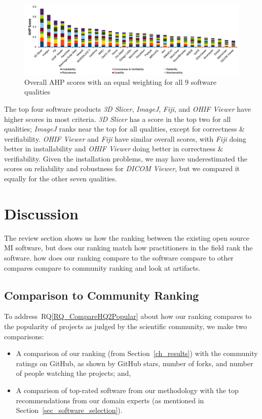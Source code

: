 \documentclass[11pt]{article}
\newcommand{\rqref}[1]{RQ\ref{#1}}
\begin{document}
\begin{figure}[!ht]
\includegraphics[scale=0.47]{overall_scores.pdf}
\caption{Overall AHP scores with an equal weighting for all 9 software qualities}

\label{fg_overall_scores}
\end{figure}

The top four software products \textit{3D Slicer}, \textit{ImageJ},
\textit{Fiji}, and \textit{OHIF Viewer} have higher scores in most criteria.
\textit{3D Slicer} has a score in the top two for all qualities; \textit{ImageJ}
ranks near the top for all qualities, except for correctness \& verifiability.
\textit{OHIF Viewer} and \textit{Fiji} have similar overall scores, with
\textit{Fiji} doing better in installability and \textit{OHIF Viewer} doing
better in correctness \& verifiability.  Given the installation problems, we may
have underestimated the scores on reliability and robustness for \textit{DICOM
Viewer}, but we compared it equally for the other seven qualities.

\section{Discussion}

The review section shows us how the ranking between the existing open source MI
software, but does our ranking match how practitioners in the field rank the
software.  how does our ranking compare to the software compare to other
compares compare to community ranking and look at artifacts.

\subsection{Comparison to Community Ranking} \label{Sec_VsCommunityRanking}

To address~\rqref{RQ_CompareHQ2Popular} about how our ranking compares to the
popularity of projects as judged by the scientific community, we make two
comparisons:
\begin{itemize}
\item A comparison of our ranking (from Section~\ref{ch_results}) with the
community ratings on GitHub, as shown by GitHub stars, number of forks, and
number of people watching the projects; and,
\item A comparison of top-rated software from our methodology with the top
recommendations from our domain experts (as mentioned in
Section~\ref{sec_software_selection}).
\end{itemize}
\end{document}
